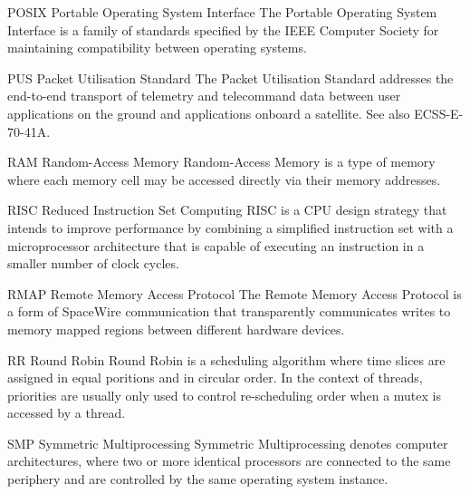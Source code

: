 


  {POSIX}
  {Portable Operating System Interface}
  {The Portable Operating System Interface is a family of standards specified
   by the IEEE Computer Society for maintaining compatibility between
   operating systems.}%

  {PUS}
  {Packet Utilisation Standard}
  {The Packet Utilisation Standard addresses the end-to-end transport of telemetry
   and telecommand data between user applications on the ground and applications
   onboard a satellite. See also ECSS-E-70-41A.}%

%
  {RAM}%
  {Random-Access Memory}%
  {Random-Access Memory is a type of memory where each memory cell may be
   accessed directly via their memory addresses.}%


%
  {RISC}%
  {Reduced Instruction Set Computing}%
  {RISC is a \gls{CPU} design strategy that intends to improve performance by
   combining a simplified instruction set with a microprocessor architecture
   that is capable of executing an instruction in a smaller number of clock
   cycles.}%

%
  {RMAP}%
  {Remote Memory Access Protocol}%
  {The Remote Memory Access Protocol is a form of \gls{SpaceWire} communication
   that transparently communicates writes to memory mapped regions between
   different hardware devices.}%


%
  {RR}%
  {Round Robin}%
  {Round Robin is a scheduling algorithm where time slices are assigned in equal
   poritions and in circular order. In the context of threads, priorities are
   usually only used to control re-scheduling order when a mutex is accessed by
   a thread.}%





%
  {SMP}%
  {Symmetric Multiprocessing}%
  {Symmetric Multiprocessing denotes computer architectures, where two or more
   identical processors are connected to the same periphery and are controlled
   by the same operating system instance.}%

